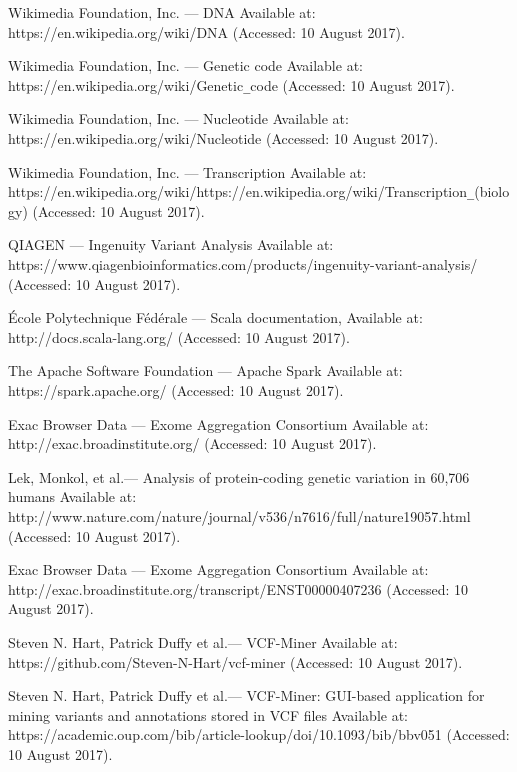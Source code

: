 \documentclass[a4paper,12pt,twoside]{article}
\begin{document}
\newpage

\begin{thebibliography}{99}

Wikimedia Foundation, Inc. — DNA
Available at: https://en.wikipedia.org/wiki/DNA (Accessed: 10 August 2017).

Wikimedia Foundation, Inc. — Genetic code
Available at: https://en.wikipedia.org/wiki/Genetic\verb!_!code (Accessed: 10 August 2017).

Wikimedia Foundation, Inc. — Nucleotide
Available at: https://en.wikipedia.org/wiki/Nucleotide (Accessed: 10 August 2017).

Wikimedia Foundation, Inc. — Transcription
Available at: https://en.wikipedia.org/wiki/https://en.wikipedia.org/wiki/Transcription\verb!_!(biology) (Accessed: 10 August 2017).

QIAGEN — Ingenuity Variant Analysis
Available at: https://www.qiagenbioinformatics.com/products/ingenuity-variant-analysis/ (Accessed: 10 August 2017).

École Polytechnique Fédérale — Scala documentation,
Available at: http://docs.scala-lang.org/ (Accessed: 10 August 2017).

The Apache Software Foundation — Apache Spark Available at: https://spark.apache.org/ (Accessed: 10 August 2017).

Exac Browser Data — Exome Aggregation Consortium
Available at: http://exac.broadinstitute.org/ (Accessed: 10 August 2017).

Lek, Monkol, et al.— Analysis of protein-coding genetic variation in 60,706 humans
Available at: http://www.nature.com/nature/journal/v536/n7616/full/nature19057.html
(Accessed: 10 August 2017).

Exac Browser Data — Exome Aggregation Consortium
Available at: http://exac.broadinstitute.org/transcript/ENST00000407236 (Accessed: 10 August 2017).

Steven N. Hart, Patrick Duffy et al.— VCF-Miner
Available at: https://github.com/Steven-N-Hart/vcf-miner (Accessed: 10 August 2017).

Steven N. Hart, Patrick Duffy et al.— VCF-Miner: GUI-based application for mining variants and annotations stored in VCF files
Available at: https://academic.oup.com/bib/article-lookup/doi/10.1093/bib/bbv051 (Accessed: 10 August 2017).


\end{thebibliography}
\end{document}
